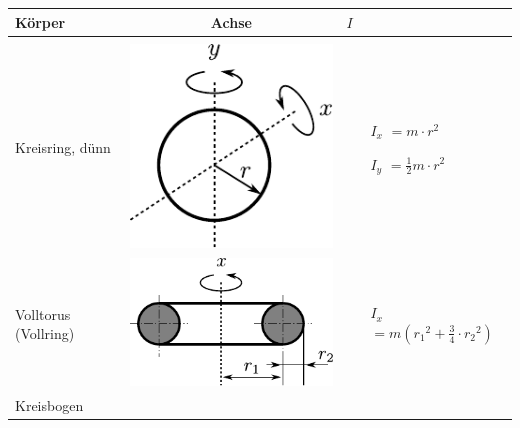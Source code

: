 \begin{table}[h!]
\centering
\begin{tabular}{m{2cm} c m{}}
Körper        & Achse        & $I$ \\
\hline
& & \\
Kreisring, dünn &
        \begin{minipage}{0.3\textwidth}
        \centering
        \includegraphics[scale=\traegscale]{../fig/traeg-kreisring-duenn.pdf}
        \end{minipage} &
                \begin{itemize}
                \item[$I_x$]$= m \cdot r^2$
                \item[$I_y$]$= \frac12 m\cdot r^2$
                \end{itemize} \\
Volltorus (Vollring) &
        \begin{minipage}{0.3\textwidth}
        \centering
        \includegraphics[scale=\traegscale]{../fig/traeg-kreisring.pdf}
        \end{minipage} &
                \begin{itemize}
                        \item[$I_x$]$= m \left({r_1}^2 + \frac{3}{4}
                                \cdot {r_2}^2\right)$
                \end{itemize} \\
Kreisbogen &
        \begin{minipage}{0.3\textwidth}

\end{minipage}
\end{tabular}
\end{table}
